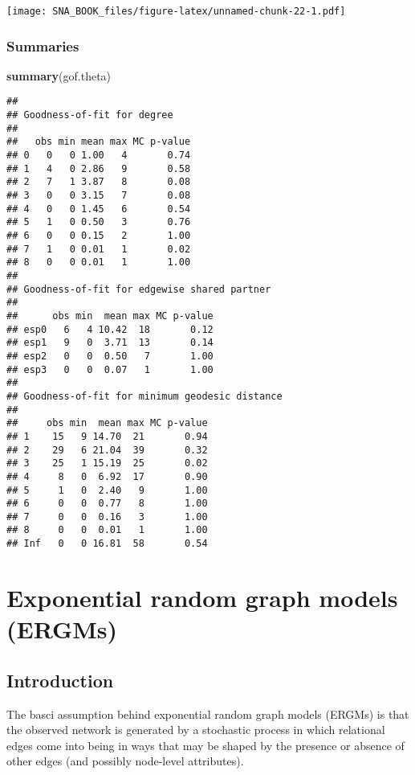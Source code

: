 \documentclass[]{book}
\newenvironment{Shaded}{\begin{snugshade}}{\end{snugshade}}
\newcommand{\KeywordTok}[1]{\textcolor[rgb]{0.13,0.29,0.53}{\textbf{{#1}}}}
\newcommand{\NormalTok}[1]{{#1}}
\begin{document}
\texttt{[image: SNA\_BOOK\_files/figure-latex/unnamed-chunk-22-1.pdf]}

\subsection{Summaries}\label{summaries}

\begin{Shaded}
\begin{Highlighting}[]
\KeywordTok{summary}\NormalTok{(gof.theta)}
\end{Highlighting}
\end{Shaded}

\begin{verbatim}
## 
## Goodness-of-fit for degree 
## 
##   obs min mean max MC p-value
## 0   0   0 1.00   4       0.74
## 1   4   0 2.86   9       0.58
## 2   7   1 3.87   8       0.08
## 3   0   0 3.15   7       0.08
## 4   0   0 1.45   6       0.54
## 5   1   0 0.50   3       0.76
## 6   0   0 0.15   2       1.00
## 7   1   0 0.01   1       0.02
## 8   0   0 0.01   1       1.00
## 
## Goodness-of-fit for edgewise shared partner 
## 
##      obs min  mean max MC p-value
## esp0   6   4 10.42  18       0.12
## esp1   9   0  3.71  13       0.14
## esp2   0   0  0.50   7       1.00
## esp3   0   0  0.07   1       1.00
## 
## Goodness-of-fit for minimum geodesic distance 
## 
##     obs min  mean max MC p-value
## 1    15   9 14.70  21       0.94
## 2    29   6 21.04  39       0.32
## 3    25   1 15.19  25       0.02
## 4     8   0  6.92  17       0.90
## 5     1   0  2.40   9       1.00
## 6     0   0  0.77   8       1.00
## 7     0   0  0.16   3       1.00
## 8     0   0  0.01   1       1.00
## Inf   0   0 16.81  58       0.54
\end{verbatim}

\chapter{Exponential random graph models (ERGMs)}\label{ERGMs}

\section{Introduction}\label{introduction}

The basci assumption behind exponential random graph models (ERGMs) is
that the observed network is generated by a stochastic process in which
relational edges come into being in ways that may be shaped by the
presence or absence of other edges (and possibly node-level attributes).
\end{document}
